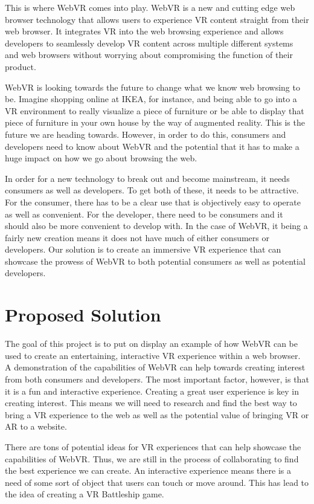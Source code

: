 \documentclass[draftclsnofoot,onecolumn,letterpaper,10pt]{article}
\begin{document}
This is where WebVR comes into play. WebVR is a new and cutting edge web browser technology that allows users to experience VR content straight from their web browser. It integrates VR into the web browsing experience and allows developers to seamlessly develop VR content across multiple different systems and web browsers without worrying about compromising the function of their product.

WebVR is looking towards the future to change what we know web browsing to be. Imagine shopping online at IKEA, for instance, and being able to go into a VR environment to really visualize a piece of furniture or be able to display that piece of furniture in your own house by the way of augmented reality. This is the future we are heading towards. However, in order to do this, consumers and developers need to know about WebVR and the potential that it has to make a huge impact on how we go about browsing the web.

In order for a new technology to break out and become mainstream, it needs consumers as well as developers. To get both of these, it needs to be attractive. For the consumer, there has to be a clear use that is objectively easy to operate as well as convenient. For the developer, there need to be consumers and it should also be more convenient to develop with. In the case of WebVR, it being a fairly new creation means it does not have much of either consumers or developers. Our solution is to create an immersive VR experience that can showcase the prowess of WebVR to both potential consumers as well as potential developers.

\section{Proposed Solution}
The goal of this project is to put on display an example of how WebVR can be used to create an entertaining, interactive VR experience within a web browser. A demonstration of the capabilities of WebVR can help towards creating interest from both consumers and developers. The most important factor, however, is that it is a fun and interactive experience. Creating a great user experience is key in creating interest. This means we will need to research and find the best way to bring a VR experience to the web as well as the potential value of bringing VR or AR to a website.

There are tons of potential ideas for VR experiences that can help showcase the capabilities of WebVR. Thus, we are still in the process of collaborating to find the best experience we can create. An interactive experience means there is a need of some sort of object that users can touch or move around. This has lead to the idea of creating a VR Battleship game.
\end{document}
